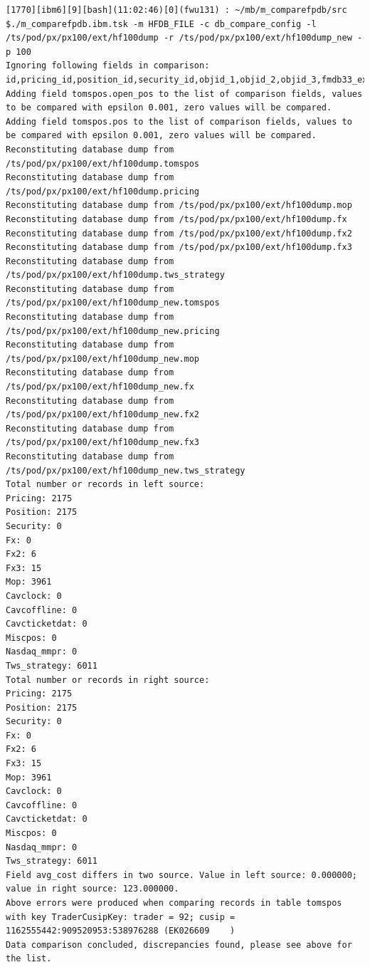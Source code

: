 \documentclass[8pt,]{article}
\begin{document}
\begin{verbatim}
[1770][ibm6][9][bash](11:02:46)[0](fwu131) : ~/mb/m_comparefpdb/src
$./m_comparefpdb.ibm.tsk -m HFDB_FILE -c db_compare_config -l /ts/pod/px/px100/ext/hf100dump -r /ts/pod/px/px100/ext/hf100dump_new -p 100
Ignoring following fields in comparison: id,pricing_id,position_id,security_id,objid_1,objid_2,objid_3,fmdb33_exists,fmdb39_exists,pos_flags,deal_id,dept,suubflag,db_status,has_umtm_px,fmdb30_bb_unique_id,can_pool_partial_ppy_assumption,can_pool_refinance_rate,fmdb30_icoc_secinc,faskpx,faskyld,fbidpx,fbidyld,fr
Adding field tomspos.open_pos to the list of comparison fields, values to be compared with epsilon 0.001, zero values will be compared.
Adding field tomspos.pos to the list of comparison fields, values to be compared with epsilon 0.001, zero values will be compared.
Reconstituting database dump from /ts/pod/px/px100/ext/hf100dump.tomspos
Reconstituting database dump from /ts/pod/px/px100/ext/hf100dump.pricing
Reconstituting database dump from /ts/pod/px/px100/ext/hf100dump.mop
Reconstituting database dump from /ts/pod/px/px100/ext/hf100dump.fx
Reconstituting database dump from /ts/pod/px/px100/ext/hf100dump.fx2
Reconstituting database dump from /ts/pod/px/px100/ext/hf100dump.fx3
Reconstituting database dump from /ts/pod/px/px100/ext/hf100dump.tws_strategy
Reconstituting database dump from /ts/pod/px/px100/ext/hf100dump_new.tomspos
Reconstituting database dump from /ts/pod/px/px100/ext/hf100dump_new.pricing
Reconstituting database dump from /ts/pod/px/px100/ext/hf100dump_new.mop
Reconstituting database dump from /ts/pod/px/px100/ext/hf100dump_new.fx
Reconstituting database dump from /ts/pod/px/px100/ext/hf100dump_new.fx2
Reconstituting database dump from /ts/pod/px/px100/ext/hf100dump_new.fx3
Reconstituting database dump from /ts/pod/px/px100/ext/hf100dump_new.tws_strategy
Total number or records in left source:
Pricing: 2175
Position: 2175
Security: 0
Fx: 0
Fx2: 6
Fx3: 15
Mop: 3961
Cavclock: 0
Cavcoffline: 0
Cavcticketdat: 0
Miscpos: 0
Nasdaq_mmpr: 0
Tws_strategy: 6011
Total number or records in right source:
Pricing: 2175
Position: 2175
Security: 0
Fx: 0
Fx2: 6
Fx3: 15
Mop: 3961
Cavclock: 0
Cavcoffline: 0
Cavcticketdat: 0
Miscpos: 0
Nasdaq_mmpr: 0
Tws_strategy: 6011
Field avg_cost differs in two source. Value in left source: 0.000000; value in right source: 123.000000.
Above errors were produced when comparing records in table tomspos with key TraderCusipKey: trader = 92; cusip = 1162555442:909520953:538976288 (EK026609    )
Data comparison concluded, discrepancies found, please see above for the list.
\end{verbatim}
\end{document}
